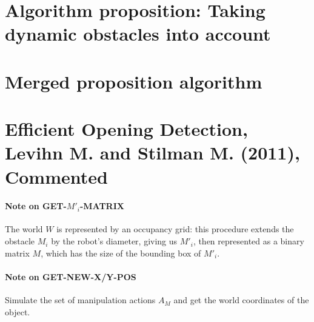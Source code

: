 


\section{Algorithm proposition: Taking dynamic obstacles into account}\label{dynamic_section}



\section{Merged proposition algorithm}\label{merged_proposition_section}





\clearpage

\section{Efficient Opening Detection, Levihn M. and Stilman M. (2011), Commented}\label{eod_section}

\paragraph{Note on GET-$M'_{i}$-MATRIX}\label{get_mi_matrix_note} The world $W$ is represented by an occupancy grid: this procedure extends the obstacle $M_{i}$ by the robot's diameter, giving us $M'_{i}$, then represented as a binary matrix $M$, which has the size of the bounding box of $M'_{i}$.


\paragraph{Note on GET-NEW-X/Y-POS}\label{x-y-pos_note} Simulate the set of manipulation actions $A_{M}$ and get the world coordinates of the object.

